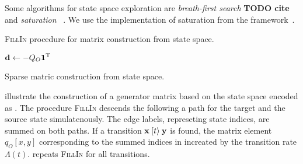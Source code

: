 Some algorithms for  state space exploration are
\emph{breath-first search} \textbf{TODO cite} and \emph{saturation}%
~\citep{Ciardo:2006}. We use the implementation of saturation from the
 framework~\citep{TDK2010_Darvas,Petridotnet}.

\begin{algorithm}
  \caption{\textsc{FillIn} procedure for matrix construction from
     state space.}
  \label{alg:genstor:symbolic:fillin}
\end{algorithm}

\begin{algorithm}
  \;
  $\bm{\mathrm{d}} \gets -Q_O \bm{\mathrm{1}}^{\mathrm{T}}$\;
  \;
  \caption{Sparse matric construction from  state space.}
  \label{alg:genstor:symbolic:sparse}
\end{algorithm}

illustrate the construction of a generator matrix based on the state
space encoded as . The procedure \textsc{FillIn} descends
the  following a path for the target and the source
state simulatenously. The edge labels, represeting state indices, are
summed on both paths. If a transition $\bm{\mathrm{x}} \mathbin{[t\rangle} \bm{\mathrm{y}}$ is
found, the matrix element $q_O[x, y]$ corresponding to the summed
indices in increated by the transition rate
$\Lambda(t)$.  repeats
\textsc{FillIn} for all transitions.

